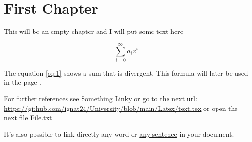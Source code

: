\documentclass{book}
\begin{document}
\tableofcontents

\chapter{First Chapter}

This will be an empty chapter and I will put some text here

\begin{equation}
\label{eq:1}
\sum_{i=0}^{\infty} a_i x^i
\end{equation}

The equation \ref{eq:1} shows a sum that is divergent. This formula 
will later be used in the page \pageref{second}.

For further references see \href{https://github.com/ignat24/University/blob/main/Latex/text.tex}{Something 
Linky} or go to the next url: \url{https://github.com/ignat24/University/blob/main/Latex/text.tex} or open 
the next file \href{run:./File.txt}{File.txt}

It's also possible to link directly any word or 
\hyperlink{thesentence}{any sentence} in your document.
\end{document}
